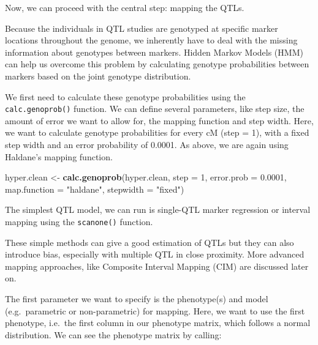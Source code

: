 \documentclass[12pt,]{krantz}
\newenvironment{Shaded}{\begin{snugshade}}{\end{snugshade}}
\newcommand{\KeywordTok}[1]{\textcolor[rgb]{0.27,0.27,0.27}{\textbf{{#1}}}}
\newcommand{\DataTypeTok}[1]{\textcolor[rgb]{0.27,0.27,0.27}{{#1}}}
\newcommand{\DecValTok}[1]{\textcolor[rgb]{0.06,0.06,0.06}{{#1}}}
\newcommand{\FloatTok}[1]{\textcolor[rgb]{0.06,0.06,0.06}{{#1}}}
\newcommand{\StringTok}[1]{\textcolor[rgb]{0.5,0.5,0.5}{{#1}}}
\newcommand{\NormalTok}[1]{{#1}}
\theoremstyle{definition}
\theoremstyle{definition}
\theoremstyle{remark}
\begin{document}
Now, we can proceed with the central step: mapping the QTLs.

Because the individuals in QTL studies are genotyped at specific marker
locations throughout the genome, we inherently have to deal with the
missing information about genotypes between markers. Hidden Markov
Models (HMM) can help us overcome this problem by calculating genotype
probabilities between markers based on the joint genotype distribution.

We first need to calculate these genotype probabilities using the
\texttt{calc.genoprob()} function. We can define several parameters,
like step size, the amount of error we want to allow for, the mapping
function and step width. Here, we want to calculate genotype
probabilities for every cM (step = 1), with a fixed step width and an
error probability of 0.0001. As above, we are again using Haldane's
mapping function.

\begin{Shaded}
\begin{Highlighting}[]
\NormalTok{hyper.clean <-}\StringTok{ }\KeywordTok{calc.genoprob}\NormalTok{(hyper.clean, }\DataTypeTok{step =} \DecValTok{1}\NormalTok{, }
                             \DataTypeTok{error.prob =} \FloatTok{0.0001}\NormalTok{, }
                             \DataTypeTok{map.function =} \StringTok{"haldane"}\NormalTok{, }
                             \DataTypeTok{stepwidth =} \StringTok{"fixed"}\NormalTok{)}
\end{Highlighting}
\end{Shaded}

The simplest QTL model, we can run is single-QTL marker regression or
interval mapping using the \texttt{scanone()} function.

These simple methods can give a good estimation of QTLs but they can
also introduce bias, especially with multiple QTL in close proximity.
More advanced mapping approaches, like Composite Interval Mapping (CIM)
are discussed later on.

The first parameter we want to specify is the phenotype(s) and model
(e.g.~parametric or non-parametric) for mapping. Here, we want to use
the first phenotype, i.e.~the first column in our phenotype matrix,
which follows a normal distribution. We can see the phenotype matrix by
calling:

\begin{Shaded}
\end{Shaded}
\end{document}
